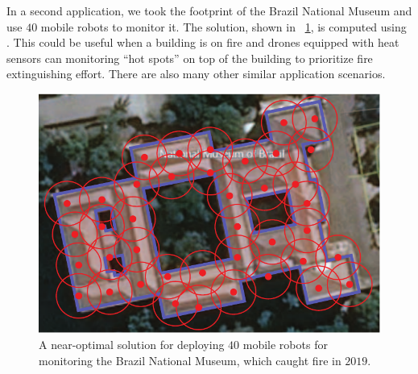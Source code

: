 In a second application, we took the footprint of the Brazil 
National Museum and use $40$ mobile robots to monitor it. The solution,
shown in ~\ref{fig:museum}, is computed using \orgtilp. This could be
useful when a building is on fire and drones equipped with heat sensors 
can monitoring ``hot spots'' on top of the building to prioritize fire 
extinguishing effort. There are also many other similar application 
scenarios. 

\begin{figure}[ht]
    \centering
    \includegraphics[width=0.95\columnwidth]{chapters/osg/figures/museum-eps-converted-to.pdf}
		\vspace*{1mm}
    \caption{A near-optimal solution for deploying $40$ mobile robots for 
		monitoring the Brazil National Museum, which caught fire in $2019$.}
    \label{fig:museum}
\end{figure}